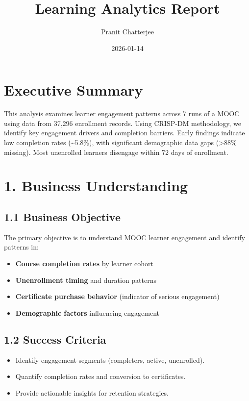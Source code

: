 \documentclass[
]{article}
\title{Learning Analytics Report}
\author{Pranit Chatterjee}
\date{2026-01-14}
\providecommand{\tightlist}{%
  \setlength{\itemsep}{0pt}\setlength{\parskip}{0pt}}
\begin{document}
\maketitle

{
\setcounter{tocdepth}{3}
\tableofcontents
}
\section{Executive Summary}\label{executive-summary}

This analysis examines learner engagement patterns across 7 runs of a
MOOC using data from 37,296 enrollment records. Using CRISP-DM
methodology, we identify key engagement drivers and completion barriers.
Early findings indicate low completion rates (\textasciitilde5.8\%),
with significant demographic data gaps (\textgreater88\% missing). Most
unenrolled learners disengage within 72 days of enrollment.

\section{1. Business Understanding}\label{business-understanding}

\subsection{1.1 Business Objective}\label{business-objective}

The primary objective is to understand MOOC learner engagement and
identify patterns in:

\begin{itemize}
\tightlist
\item
  \textbf{Course completion rates} by learner cohort\\
\item
  \textbf{Unenrollment timing} and duration patterns\\
\item
  \textbf{Certificate purchase behavior} (indicator of serious
  engagement)\\
\item
  \textbf{Demographic factors} influencing engagement
\end{itemize}

\subsection{1.2 Success Criteria}\label{success-criteria}

\begin{itemize}
\tightlist
\item
  Identify engagement segments (completers, active, unenrolled).\\
\item
  Quantify completion rates and conversion to certificates.\\
\item
  Provide actionable insights for retention strategies.
\end{itemize}
\end{document}
